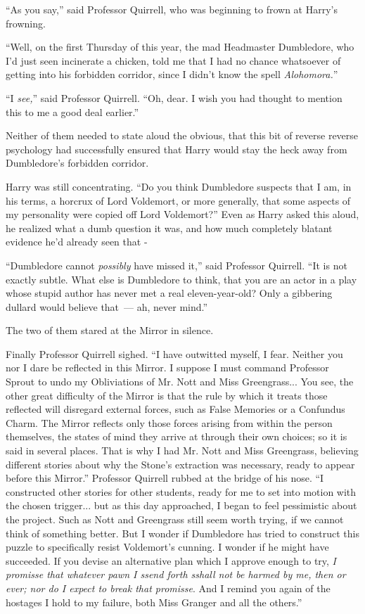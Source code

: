 ``As you say,'' said Professor Quirrell, who was beginning to frown at Harry's frowning.

``Well, on the first Thursday of this year, the mad Headmaster Dumbledore, who I'd just seen incinerate a chicken, told me that I had no chance whatsoever of getting into his forbidden corridor, since I didn't know the spell \emph{Alohomora.}''

``I \emph{see,}'' said Professor Quirrell. ``Oh, dear. I wish you had thought to mention this to me a good deal earlier.''

Neither of them needed to state aloud the obvious, that this bit of reverse reverse psychology had successfully ensured that Harry would stay the heck away from Dumbledore's forbidden corridor.

Harry was still concentrating. ``Do you think Dumbledore suspects that I am, in his terms, a horcrux of Lord Voldemort, or more generally, that some aspects of my personality were copied off Lord Voldemort?'' Even as Harry asked this aloud, he realized what a dumb question it was, and how much completely blatant evidence he'd already seen that -

``Dumbledore cannot \emph{possibly} have missed it,'' said Professor Quirrell. ``It is not exactly subtle. What else is Dumbledore to think, that you are an actor in a play whose stupid author has never met a real eleven-year-old? Only a gibbering dullard would believe that~--- ah, never mind.''

The two of them stared at the Mirror in silence.

Finally Professor Quirrell sighed. ``I have outwitted myself, I fear. Neither you nor I dare be reflected in this Mirror. I suppose I must command Professor Sprout to undo my Obliviations of Mr. Nott and Miss Greengrass... You see, the other great difficulty of the Mirror is that the rule by which it treats those reflected will disregard external forces, such as False Memories or a Confundus Charm. The Mirror reflects only those forces arising from within the person themselves, the states of mind they arrive at through their own choices; so it is said in several places. That is why I had Mr. Nott and Miss Greengrass, believing different stories about why the Stone's extraction was necessary, ready to appear before this Mirror.'' Professor Quirrell rubbed at the bridge of his nose. ``I constructed other stories for other students, ready for me to set into motion with the chosen trigger... but as this day approached, I began to feel pessimistic about the project. Such as Nott and Greengrass still seem worth trying, if we cannot think of something better. But I wonder if Dumbledore has tried to construct this puzzle to specifically resist Voldemort's cunning. I wonder if he might have succeeded. If you devise an alternative plan which I approve enough to try, \emph{I promisse that whatever pawn I ssend forth sshall not be harmed by me, then or ever; nor do I expect to break that promisse}. And I remind you again of the hostages I hold to my failure, both Miss Granger and all the others.''

